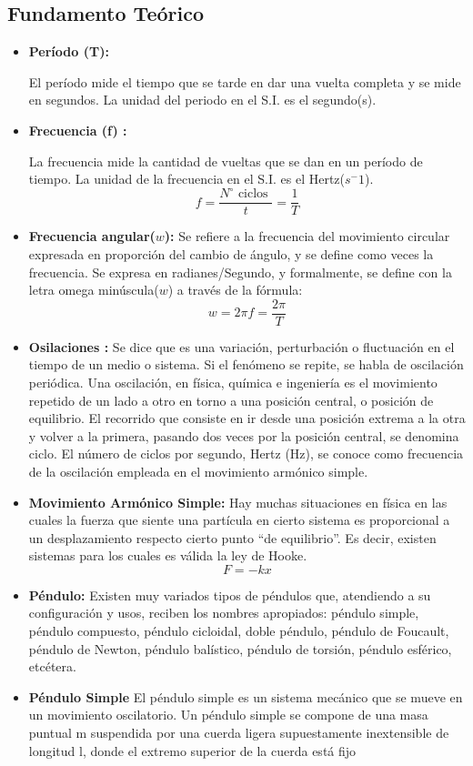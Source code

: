 \subsection{Fundamento Teórico}
\begin{itemize}
    \item \textbf{Período (T):}

El período mide el tiempo que se tarde en dar una vuelta completa y se mide en segundos.
La unidad del periodo en el S.I. es el segundo(s). 
    \item \textbf{Frecuencia (f) :}
    
    La frecuencia mide la cantidad de vueltas que se dan en un período de tiempo. La unidad de
la frecuencia en el S.I. es el Hertz($s^-1$). 
\begin{equation*}
    f=\dfrac{N^{\circ} \text { ciclos }}{t}=\dfrac{1}{T}    
\end{equation*}
    \item \textbf{Frecuencia angular($w$):}
Se refiere a la frecuencia del movimiento circular expresada en proporción del cambio de
ángulo, y se define como veces la frecuencia. Se expresa en radianes/Segundo, y formalmente,
se define con la letra omega minúscula($w$) a través de la fórmula: 
    \begin{equation*}
        w=2\pi f=\dfrac{2\pi}T
    \end{equation*}
    \item \textbf{Osilaciones :}
    Se dice que es una variación, perturbación o fluctuación en el tiempo de un medio o sistema. Si
el fenómeno se repite, se habla de oscilación periódica.
Una oscilación, en física, química e ingeniería es el movimiento repetido de un lado a otro en
torno a una posición central, o posición de equilibrio. El recorrido que consiste en ir desde una
posición extrema a la otra y volver a la primera, pasando dos veces por la posición central, se
denomina ciclo. El número de ciclos por segundo, Hertz (Hz), se conoce como frecuencia de la
oscilación empleada en el movimiento armónico simple.
    \item \textbf{Movimiento Armónico Simple:}
Hay muchas situaciones en física en las cuales la fuerza que siente una partícula en cierto
sistema es proporcional a un desplazamiento respecto cierto punto “de equilibrio”. Es decir,
existen sistemas para los cuales es válida la ley de Hooke.
\begin{equation*}
    F = -kx
\end{equation*}
    \item \textbf{Péndulo:}
Existen muy variados tipos de péndulos que, atendiendo a su configuración y usos,
reciben los nombres apropiados: péndulo simple, péndulo compuesto, péndulo cicloidal,
doble péndulo, péndulo de Foucault, péndulo de Newton, péndulo balístico, péndulo de
torsión, péndulo esférico, etcétera.
    \item \textbf{Péndulo Simple}
El péndulo simple es un sistema mecánico que se mueve en un movimiento oscilatorio.
Un péndulo simple se compone de una masa puntual m suspendida por una cuerda
ligera supuestamente inextensible de longitud l, donde el extremo superior de la cuerda
está fijo
\end{itemize}
